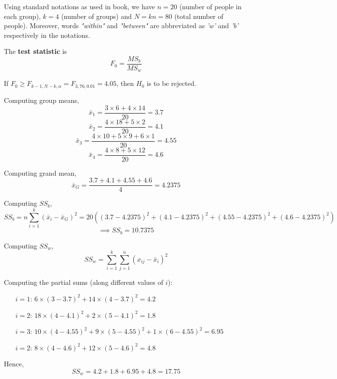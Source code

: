 \documentclass[12pt, oneside]{article}
\begin{document}
\begin{enumerate}
\begin{enumerate}
Using standard notations as used in book, we have $n=20$ (number of people in each group), $k=4$ (number of groups) and $N=kn=80$ (total number of people). Moreover, words \textit{"within"} and \textit{"between"} are abbreviated as \textit{'w'} and \textit{'b'} respectively in the notations.

The \textbf{test statistic} is 
\[ F_0 = \frac{MS_b}{MS_w} \]

If $F_0 \ge F_{k-1,N-k,\alpha} = F_{3,76,0.01} = 4.05$, then $H_0$ is to be rejected.

Computing group means,
\[ \bar{x}_1 = \frac{3 \times 6 + 4 \times 14}{20} = 3.7  \]
\[ \bar{x}_2 = \frac{4 \times 18 + 5 \times 2 }{20} = 4.1  \]
\[ \bar{x}_3 = \frac{4 \times 10  + 5 \times 9  +6 \times 1 }{20} = 4.55  \]
\[ \bar{x}_4 = \frac{4 \times 8  + 5 \times 12}{20} = 4.6  \]

Computing grand mean,
\[ \bar{x}_G = \frac{3.7 + 4.1 + 4.55 + 4.6}{4} = 4.2375  \]

Computing $SS_b$,
\[ SS_b = n \sum_{i=1}^{k} ( \bar{x}_i - \bar{x}_G  )^2  = 20( (3.7 - 4.2375) ^2 + (4.1 - 4.2375) ^2 + (4.55 - 4.2375) ^2 + (4.6 - 4.2375) ^2   ) \] 
\[ \implies  SS_b = 10.7375 \]

Computing $SS_w$,
\[ SS_w = \sum_{i=1}^{k}\sum_{j=1}^{n} ( x_{ij} - \bar{x}_i   )^2  \]

Computing the partial sums (along different values of $i$):
\begin{itemize}
    \item[$i=1$: ] $ 6 \times (3-3.7)^2 + 14 \times (4-3.7)^2 = 4.2 $
    \item[$i=2$: ] $ 18 \times (4-4.1)^2 + 2 \times (5-4.1)^2 = 1.8 $
    \item[$i=3$: ] $ 10 \times (4-4.55)^2 + 9 \times (5-4.55)^2 + 1 \times (6-4.55)^2 = 6.95 $
    \item[$i=2$: ] $ 8 \times (4-4.6)^2 + 12 \times (5-4.6)^2 = 4.8 $
\end{itemize}

Hence,
\[ SS_w = 4.2 + 1.8 + 6.95 + 4.8 = 17.75 \]


%         
%         


\end{enumerate}
\end{enumerate}
\end{document}

